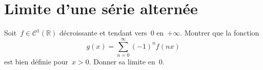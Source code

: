 \section{Limite d'une série alternée}

Soit~$f \in \mathcal{C}^1(\mathbb{R})$ décroissante et tendant vers~0 en~$+\infty$.
Montrer que la fonction
\[ g(x) = \sum_{n = 0}^\infty (-1)^n f(nx) \]
est bien définie pour~$x > 0$.
Donner sa limite en~0.

